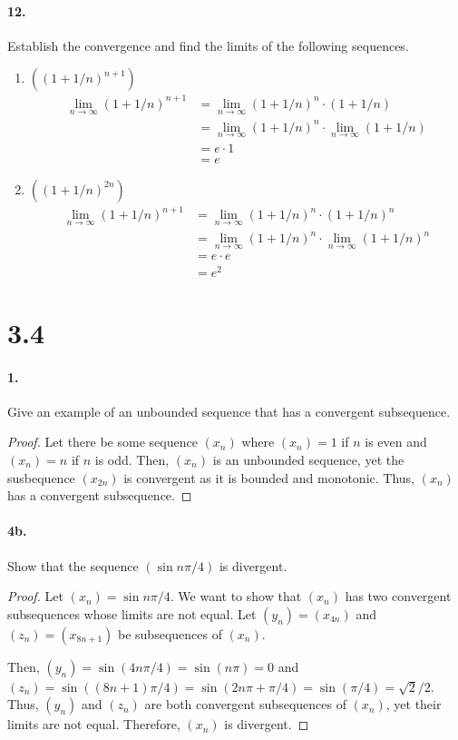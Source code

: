 \documentclass[12pt]{article}
\theoremstyle{remark}
\begin{document}
\paragraph{12.} Establish the convergence and find the limits of the following sequences.
\begin{enumerate}[label=(\alph*)]
    \item $((1 + 1/n)^{n + 1})$
    \begin{align*}
        \lim_{n \to \infty} (1 + 1/n)^{n + 1} &= \lim_{n \to \infty} (1 + 1/n)^n \cdot (1 + 1/n) \\
        &= \lim_{n \to \infty} (1 + 1/n)^n \cdot \lim_{n \to \infty} (1 + 1/n) \\
        &= e \cdot 1 \\
        &= e
    \end{align*}

    \item $((1 + 1/n)^{2n})$
    \begin{align*}
        \lim_{n \to \infty} (1 + 1/n)^{n + 1} &= \lim_{n \to \infty} (1 + 1/n)^n \cdot (1 + 1/n)^n \\
        &= \lim_{n \to \infty} (1 + 1/n)^n \cdot \lim_{n \to \infty} (1 + 1/n)^n \\
        &= e \cdot e \\
        &= e^2
    \end{align*}
\end{enumerate}

\section*{3.4}
\paragraph{1.} Give an example of an unbounded sequence that has a convergent subsequence.
\begin{proof}
    Let there be some sequence $(x_n)$ where $(x_n) = 1$ if $n$ is even and $(x_n) = n$ if $n$ is odd. Then, $(x_n)$ is an unbounded sequence, yet the susbequence $(x_{2n})$ is convergent as it is bounded and monotonic. Thus, $(x_n)$ has a convergent subsequence.
\end{proof}

\paragraph{4b.} Show that the sequence $(\sin n\pi/4)$ is divergent.
\begin{proof}
    Let $(x_n) = \sin n\pi/4$. We want to show that $(x_n)$ has two convergent subsequences whose limits are not equal. Let $(y_n) = (x_{4n})$ and $(z_n) = (x_{8n + 1})$ be subsequences of $(x_n)$.

    Then, $(y_n) = \sin (4n\pi/4) = \sin (n\pi) = 0$ and $(z_n) = \sin((8n + 1)\pi/4) = \sin(2n\pi + \pi/4) = \sin(\pi/4) = \sqrt{2}/2$. Thus, $(y_n)$ and $(z_n)$ are both convergent subsequences of $(x_n)$, yet their limits are not equal. Therefore, $(x_n)$ is divergent.
\end{proof}
\end{document}
